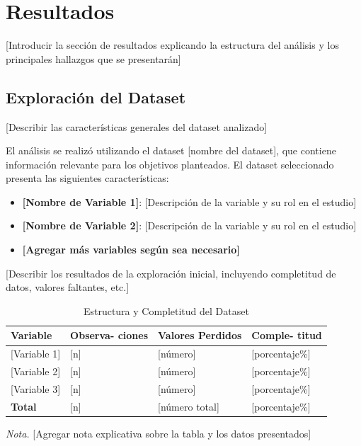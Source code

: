 \documentclass[12pt, letterpaper]{article}
\begin{document}
\section{Resultados}

 [Introducir la sección de resultados explicando la estructura del análisis y los principales hallazgos que se presentarán]

\subsection{Exploración del Dataset}

[Describir las características generales del dataset analizado]

El análisis se realizó utilizando el dataset [nombre del dataset], que contiene información relevante para los objetivos planteados. El dataset seleccionado presenta las siguientes características:

\begin{itemize}
    \item \textbf{[Nombre de Variable 1]}: [Descripción de la variable y su rol en el estudio]
    \item \textbf{[Nombre de Variable 2]}: [Descripción de la variable y su rol en el estudio]
    \item \textbf{[Agregar más variables según sea necesario]}
\end{itemize}

[Describir los resultados de la exploración inicial, incluyendo completitud de datos, valores faltantes, etc.]

\begin{table}[H]
    \centering
    \caption{Estructura y Completitud del Dataset}
    \begin{tabular}{@{}l>{\centering}p{2.5cm}>{\centering}p{2.5cm}>{\centering\arraybackslash}p{2cm}@{}}
        \toprule
        \textbf{Variable} & \textbf{Observa-} \textbf{ciones} & \textbf{Valores} \textbf{Perdidos} & \textbf{Comple-} \textbf{titud} \\
        \midrule
        {[}Variable 1{]}  & {[}n{]}                           & {[}número{]}                       & {[}porcentaje\%{]}              \\
        {[}Variable 2{]}  & {[}n{]}                           & {[}número{]}                       & {[}porcentaje\%{]}              \\
        {[}Variable 3{]}  & {[}n{]}                           & {[}número{]}                       & {[}porcentaje\%{]}              \\
        \midrule
        \textbf{Total}    & {[}n{]}                           & {[}número total{]}                 & {[}porcentaje\%{]}              \\
        \bottomrule
    \end{tabular}
    \label{tab:estructura}

    \vspace{0.2cm}
    \textit{Nota.} [Agregar nota explicativa sobre la tabla y los datos presentados]
\end{table}
\end{document}
